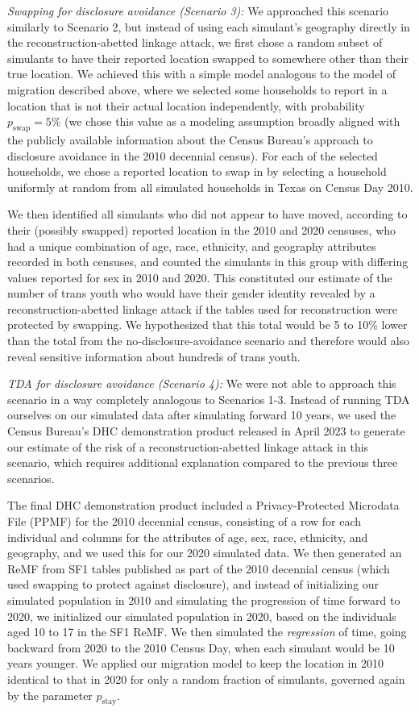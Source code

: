 \documentclass{jpc} %
\theoremstyle{plain}\newtheorem{satz}[thm]{Satz} %
\begin{document}
\emph{Swapping for disclosure avoidance (Scenario 3):} We approached this scenario similarly to Scenario 2, but instead of using each simulant's geography directly in the reconstruction-abetted linkage attack, we first chose a random subset of simulants to have their reported location swapped to somewhere other than their true location.  
We achieved this with a simple model analogous to the model of migration described above, where we selected some households to report in a location that is not their actual location independently, with probability $p_\text{swap} = 5\%$ (we chose this value as a modeling assumption broadly aligned with the  publicly available information about the Census Bureau's approach to disclosure avoidance in the 2010 decennial census).  For each of the selected households, we chose a reported location to swap in by selecting a household uniformly at random from all simulated households in Texas on Census Day 2010.

We then identified all simulants who did not appear to have moved, according to their (possibly swapped) reported location in the 2010 and 2020 censuses, who had a unique combination of age, race, ethnicity, and geography attributes recorded in both censuses, and counted the simulants in this group with differing values reported for sex in 2010 and 2020.  This constituted our estimate of the number of trans youth who would have their gender identity revealed by a reconstruction-abetted linkage attack if the tables used for reconstruction were protected by swapping.  We hypothesized that this total would be 5 to 10\% lower than the total from the no-disclosure-avoidance scenario and therefore would also reveal sensitive information about hundreds of trans youth.

\emph{TDA for disclosure avoidance (Scenario 4):} We were not able to approach this scenario in a way completely analogous to Scenarios 1-3.  Instead of running TDA ourselves on our simulated data after simulating forward 10 years, we used the Census Bureau's DHC demonstration product released in April 2023 to generate our estimate of the risk of a reconstruction-abetted linkage attack in this scenario, which requires additional explanation compared to the previous three scenarios.

The final DHC demonstration product included a Privacy-Protected Microdata File (PPMF) for the 2010 decennial census, consisting of a row for each individual and columns for the attributes of age, sex, race, ethnicity, and geography, and we used this for our 2020 simulated data. We then generated an ReMF from SF1 tables published as part of the 2010 decennial census (which used swapping to protect against disclosure), and instead of initializing our simulated population in 2010 and simulating the progression of time forward to 2020, we initialized our simulated population in 2020, based on the individuals aged 10 to 17 in the SF1 ReMF.  We then simulated the \emph{regression} of time, going backward from 2020 to the 2010 Census Day, when each simulant would be 10 years younger.  We applied our migration model to keep the location in 2010 identical to that in 2020 for only a random fraction of simulants, governed again by the parameter $p_{\text{stay}}$.
\end{document}

